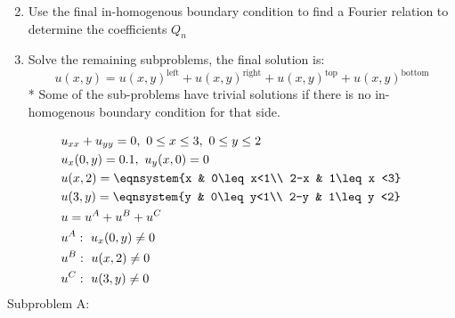 \begin{enumerate}
\begin{tcolorbox}
\begin{multicols}{2}
\end{multicols}
\end{tcolorbox}

    \item Use the final in-homogenous boundary condition to find a Fourier relation to determine the coefficients $Q_n$
    
    \item Solve the remaining subproblems, the final solution is:
    $$u(x,y) = u(x,y)^{\text{left}} + u(x,y)^{\text{right}} + u(x,y)^{\text{top}} + u(x,y)^{\text{bottom}}$$
    * Some of the sub-problems have trivial solutions if there is no in-homogenous boundary condition for that side.

\end{enumerate}
\begin{align*}
    &u_{xx}+u_{yy}=0,\ 0\leq x\leq 3,\ 0\leq y\leq 2\\
    &u_x(0,y)=0.1,\ u_y(x,0)=0\\
    &u(x,2)=\eqnsystem{x & 0\leq x<1\\ 2-x & 1\leq x <3}\\
    &u(3,y)=\eqnsystem{y & 0\leq y<1\\ 2-y & 1\leq y <2}\\
    &u=u^A+u^B+u^C\\
    &u^A:\ u_x(0,y)\neq0\\
    &u^B:\ u(x,2)\neq0\\
    &u^C:\ u(3,y)\neq0
\end{align*}
Subproblem A:
